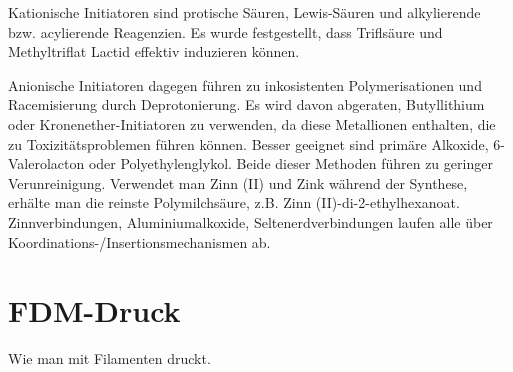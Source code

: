 \documentclass[10pt]{article}
\begin{document}
    Kationische Initiatoren sind protische Säuren, Lewis-Säuren und alkylierende bzw. acylierende Reagenzien.
    Es wurde festgestellt, dass Triflsäure und Methyltriflat Lactid effektiv induzieren können.

    Anionische Initiatoren dagegen führen zu inkosistenten Polymerisationen und Racemisierung durch Deprotonierung.
    Es wird davon abgeraten, Butyllithium oder Kronenether-Initiatoren zu verwenden, da diese Metallionen enthalten, die zu Toxizitätsproblemen führen können.
    Besser geeignet sind primäre Alkoxide, 6-Valerolacton oder Polyethylenglykol.
    Beide dieser Methoden führen zu geringer Verunreinigung.
    Verwendet man Zinn (II) und Zink während der Synthese, erhälte man die reinste Polymilchsäure, z.B. Zinn (II)-di-2-ethylhexanoat.
    Zinnverbindungen, Aluminiumalkoxide, Seltenerdverbindungen laufen alle über Koordinations-/Insertionsmechanismen ab.


    \section{FDM-Druck}
    Wie man mit Filamenten druckt.
\end{document}
